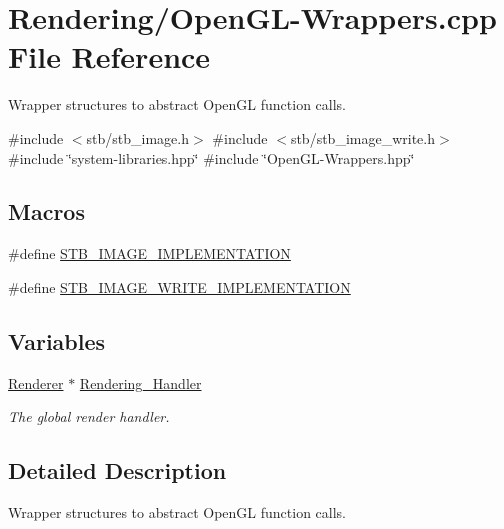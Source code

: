\hypertarget{OpenGL-Wrappers_8cpp}{}\section{Rendering/\+Open\+G\+L-\/\+Wrappers.cpp File Reference}
\label{OpenGL-Wrappers_8cpp}


Wrapper structures to abstract Open\+GL function calls.  


{\ttfamily \#include $<$stb/stb\+\_\+image.\+h$>$}\newline
{\ttfamily \#include $<$stb/stb\+\_\+image\+\_\+write.\+h$>$}\newline
{\ttfamily \#include \char`\"{}system-\/libraries.\+hpp\char`\"{}}\newline
{\ttfamily \#include \char`\"{}Open\+G\+L-\/\+Wrappers.\+hpp\char`\"{}}\newline
\subsection*{Macros}
\begin{DoxyCompactItemize}
\item 
\#define \mbox{\hyperlink{OpenGL-Wrappers_8cpp_a18372412ad2fc3ce1e3240b3cf0efe78}{S\+T\+B\+\_\+\+I\+M\+A\+G\+E\+\_\+\+I\+M\+P\+L\+E\+M\+E\+N\+T\+A\+T\+I\+ON}}
\item 
\#define \mbox{\hyperlink{OpenGL-Wrappers_8cpp_aefe397a94e8feddc652f92ef40ce9597}{S\+T\+B\+\_\+\+I\+M\+A\+G\+E\+\_\+\+W\+R\+I\+T\+E\+\_\+\+I\+M\+P\+L\+E\+M\+E\+N\+T\+A\+T\+I\+ON}}
\end{DoxyCompactItemize}
\subsection*{Variables}
\begin{DoxyCompactItemize}
\item 
\mbox{\hyperlink{classRenderer}{Renderer}} $\ast$ \mbox{\hyperlink{OpenGL-Wrappers_8cpp_a21679bfe3ff6515d046879b080ac8ca9}{Rendering\+\_\+\+Handler}}
\begin{DoxyCompactList}\small\item\em The global render handler. \end{DoxyCompactList}\end{DoxyCompactItemize}


\subsection{Detailed Description}
Wrapper structures to abstract Open\+GL function calls. 

